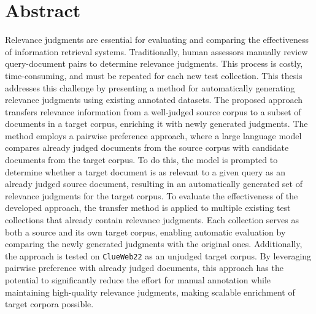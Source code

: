 \section*{Abstract}

Relevance judgments are essential for evaluating and comparing the effectiveness of information retrieval systems. Traditionally, human assessors manually review query-document pairs to determine relevance judgments. This process is costly, time-consuming, and must be repeated for each new test collection. This thesis addresses this challenge by presenting a method for automatically generating relevance judgments using existing annotated datasets. The proposed approach transfers relevance information from a well-judged source corpus to a subset of documents in a target corpus, enriching it with newly generated judgments. The method employs a pairwise preference approach, where a large language model compares already judged documents from the source corpus with candidate documents from the target corpus. To do this, the model is prompted to determine whether a target document is as relevant to a given query as an already judged source document, resulting in an automatically generated set of relevance judgments for the target corpus. To evaluate the effectiveness of the developed approach, the transfer method is applied to multiple existing test collections that already contain relevance judgments. Each collection serves as both a source and its own target corpus, enabling automatic evaluation by comparing the newly generated judgments with the original ones. Additionally, the approach is tested on \texttt{ClueWeb22} as an unjudged target corpus. By leveraging pairwise preference with already judged documents, this approach has the potential to significantly reduce the effort for manual annotation while maintaining high-quality relevance judgments, making scalable enrichment of target corpora possible.

